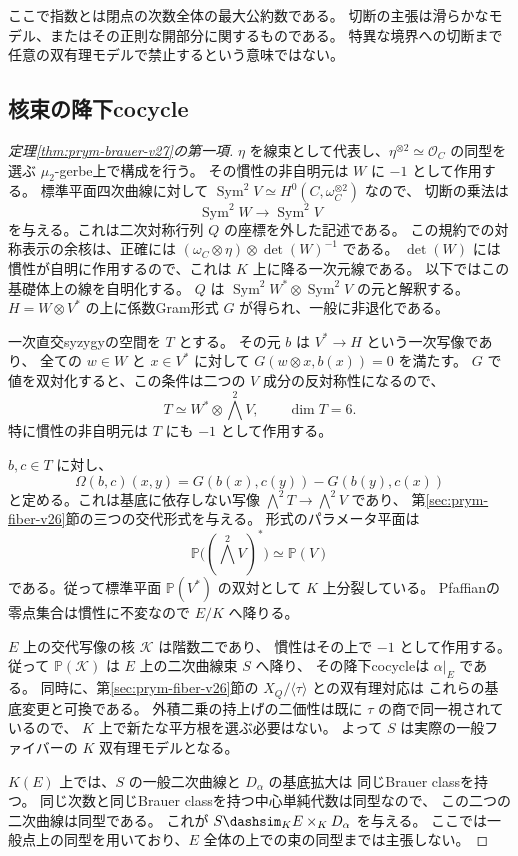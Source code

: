 ここで指数とは閉点の次数全体の最大公約数である。
切断の主張は滑らかなモデル、またはその正則な開部分に関するものである。
特異な境界への切断まで任意の双有理モデルで禁止するという意味ではない。

\subsection{核束の降下cocycle}
\begin{proof}[定理\ref{thm:prym-brauer-v27}の第一項]
$\eta$ を線束として代表し、$\eta^{\otimes2}\simeq\mathcal O_C$ の同型を選ぶ
$\mu_2$-gerbe上で構成を行う。
その慣性の非自明元は $W$ に $-1$ として作用する。
標準平面四次曲線に対して
$\operatorname{Sym}^2V\simeq H^0(C,\omega_C^{\otimes2})$ なので、
切断の乗法は
\[
 \operatorname{Sym}^2W\longrightarrow\operatorname{Sym}^2V
\]
を与える。これは二次対称行列 $Q$ の座標を外した記述である。
この規約での対称表示の余核は、正確には
$(\omega_C\otimes\eta)\otimes\det(W)^{-1}$ である。
$\det(W)$ には慣性が自明に作用するので、これは $K$ 上に降る一次元線である。
以下ではこの基礎体上の線を自明化する。
$Q$ は $\operatorname{Sym}^2W^*\otimes\operatorname{Sym}^2V$ の元と解釈する。
$H=W\otimes V^*$ の上に係数Gram形式 $G$ が得られ、一般に非退化である。

一次直交syzygyの空間を $T$ とする。
その元 $b$ は $V^*\to H$ という一次写像であり、
全ての $w\in W$ と $x\in V^*$ に対して
$G(w\otimes x,b(x))=0$ を満たす。
$G$ で値を双対化すると、この条件は二つの $V$ 成分の反対称性になるので、
\[
 T\simeq W^*\otimes\bigwedge^2V,\qquad \dim T=6.
\]
特に慣性の非自明元は $T$ にも $-1$ として作用する。

$b,c\in T$ に対し、
\[
 \Omega(b,c)(x,y)=G(b(x),c(y))-G(b(y),c(x))
\]
と定める。これは基底に依存しない写像
$\bigwedge^2T\to\bigwedge^2V$ であり、
第\ref{sec:prym-fiber-v26}節の三つの交代形式を与える。
形式のパラメータ平面は
\[
 \mathbb P\bigl((\bigwedge^2V)^*\bigr)\simeq\mathbb P(V)
\]
である。従って標準平面 $\mathbb P(V^*)$ の双対として $K$ 上分裂している。
Pfaffianの零点集合は慣性に不変なので $E/K$ へ降りる。

$E$ 上の交代写像の核 $\mathcal K$ は階数二であり、
慣性はその上で $-1$ として作用する。
従って $\mathbb P(\mathcal K)$ は $E$ 上の二次曲線束 $S$ へ降り、
その降下cocycleは $\alpha|_E$ である。
同時に、第\ref{sec:prym-fiber-v26}節の $X_Q/\langle\tau\rangle$ との双有理対応は
これらの基底変更と可換である。
外積二乗の持上げの二価性は既に $\tau$ の商で同一視されているので、
$K$ 上で新たな平方根を選ぶ必要はない。
よって $S$ は実際の一般ファイバーの $K$ 双有理モデルとなる。

$K(E)$ 上では、$S$ の一般二次曲線と $D_\alpha$ の基底拡大は
同じBrauer classを持つ。
同じ次数と同じBrauer classを持つ中心単純代数は同型なので、
この二つの二次曲線は同型である。
これが $S\dashsim_K E\times_KD_\alpha$ を与える。
ここでは一般点上の同型を用いており、$E$ 全体の上での束の同型までは主張しない。
\end{proof}


